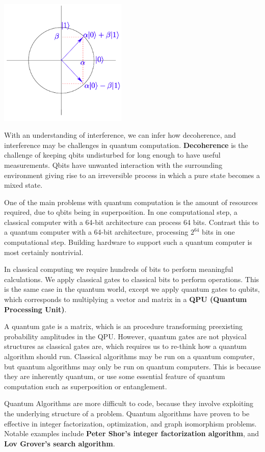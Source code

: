 \documentclass[letterpaper, 10 pt, conference]{ieeeconf}
\begin{document}
\includegraphics[width=230px]{circle.png}

With an understanding of interference, we can infer how decoherence, and interference may be challenges in quantum computation.  \textbf{Decoherence} is the challenge of keeping qbits undisturbed for long enough to have useful measurements.  Qbits have unwanted interaction with the surrounding environment giving rise to an irreversible process in which a pure state becomes a mixed state.

One of the main problems with quantum computation is the amount of resources required, due to qbits being in superposition.  In one computational step, a classical computer with a 64-bit architecture can process 64 bits.  Contrast this to a quantum computer with a 64-bit architecture, processing \( 2^{64} \) bits in one computational step.  Building hardware to support such a quantum computer is most certainly nontrivial.

In classical computing we require hundreds of bits to perform meaningful calculations.  We apply classical gates to classical bits to perform operations.  This is the same case in the quantum world, except we apply quantum gates to qubits, which corresponds to multiplying a vector and matrix in a \textbf{QPU (Quantum Processing Unit)}.

A quantum gate is a matrix, which is an procedure transforming preexisting probability amplitudes in the QPU.  However, quantum gates are not physical structures as classical gates are, which requires us to re-think how a quantum algorithm should run.  Classical algorithms may be run on a quantum computer, but quantum algorithms may only be run on quantum computers.  This is because they are inherently quantum, or use some essential feature of quantum computation such as superposition or entanglement.

Quantum Algorithms are more difficult to code, because they involve exploiting the underlying structure of a problem.  Quantum algorithms have proven to be effective in integer factorization, optimization, and graph isomorphism problems.  Notable examples include \textbf{Peter Shor's integer factorization algorithm}, and \textbf{Lov Grover's search algorithm}.
\end{document}
